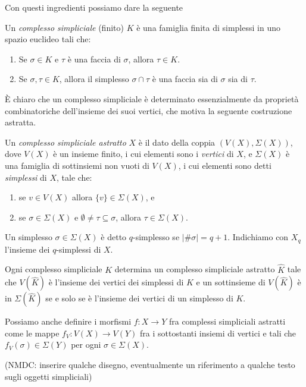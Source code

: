 Con questi ingredienti possiamo dare la seguente
\begin{defn}
Un \emph{complesso simpliciale} (finito) $K$ è una famiglia finita di simplessi in uno spazio euclideo tali che:
\begin{enumerate}
  \item Se $\sigma\in K$ e $\tau$ è una faccia di $\sigma$, allora $\tau \in K$.
  \item Se $\sigma,\tau\in K$, allora il simplesso $\sigma\cap\tau$ è una faccia sia di $\sigma$ sia di $\tau$.
\end{enumerate}
\end{defn}

\`E chiaro che un complesso simpliciale è determinato essenzialmente da proprietà combinatoriche dell'insieme dei suoi vertici, che motiva la seguente costruzione astratta.

\begin{defn}
  Un \emph{complesso simpliciale astratto} $X$ è il dato della coppia $(V(X), \Sigma(X))$, dove $V(X)$ è un insieme finito, i cui elementi sono i \emph{vertici} di $X$, e $\Sigma(X)$ è una famiglia di sottinsiemi non vuoti di $V(X)$, i cui elementi sono detti \emph{simplessi} di $X$, tale che:
  \begin{enumerate}
    \item se $v\in V(X)$ allora $\{v\}\in\Sigma(X)$, e
    \item se $\sigma \in \Sigma(X)$ e $\emptyset\neq\tau\subseteq\sigma$, allora $\tau\in\Sigma(X)$.
  \end{enumerate}

  Un simplesso $\sigma\in\Sigma(X)$ è detto $q$-simplesso se $|\#\sigma| = q+1$. Indichiamo con $X_q$ l'insieme dei $q$-simplessi di $X$.
\end{defn}

\begin{rmk}
  Ogni complesso simpliciale $K$ determina un complesso simpliciale astratto $\widehat{K}$ tale che $V(\widehat{K})$ è l'insieme dei vertici dei simplessi di $K$ e un sottinsieme di $V(\widehat{K})$ è in $\Sigma(\widehat{K})$ se e solo se è l'insieme dei vertici di un simplesso di $K$.
\end{rmk}

Possiamo anche definire i morfismi $f:X\to Y$ fra complessi simpliciali astratti come le mappe $f_V:V(X)\to V(Y)$ fra i sottostanti insiemi di vertici e tali che $f_V(\sigma)\in \Sigma(Y)$ per ogni $\sigma \in \Sigma(X)$.

(NMDC: inserire qualche disegno, eventualmente un riferimento a qualche testo sugli oggetti simpliciali)


